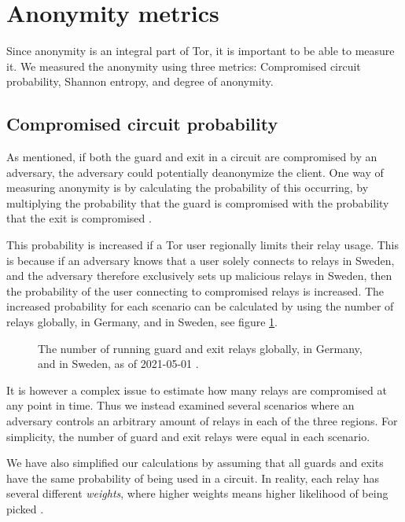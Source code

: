 \documentclass{kththesis}
\begin{document}
\section{Anonymity metrics}
\label{section:anonymityMetrics}
Since anonymity is an integral part of Tor, it is important to be able to measure it. We measured the anonymity using three metrics: Compromised circuit probability, Shannon entropy, and degree of anonymity.

\subsection{Compromised circuit probability}
\label{section:compromisedProbability}
As mentioned, if both the guard and exit in a circuit are compromised by an adversary, the adversary could potentially deanonymize the client. One way of measuring anonymity is by calculating the probability of this occurring, by multiplying the probability that the guard is compromised with the probability that the exit is compromised \parencite{annessilower}. 

This probability is increased if a Tor user regionally limits their relay usage. This is because if an adversary knows that a user solely connects to relays in Sweden, and the adversary therefore exclusively sets up malicious relays in Sweden, then the probability of the user connecting to compromised relays is increased. The increased probability for each scenario can be calculated by using the number of relays globally, in Germany, and in Sweden, see figure \ref{fig:numberGuardExitRelays}.

\begin{figure}[!htb]
  \centering
  
  \caption{The number of running guard and exit relays globally, in Germany, and in Sweden, as of 2021-05-01 \parencite{TorRelaySearch}.}
  \label{fig:numberGuardExitRelays}
\end{figure}

It is however a complex issue to estimate how many relays are compromised at any point in time. Thus we instead examined several scenarios where an adversary controls an arbitrary amount of relays in each of the three regions. For simplicity, the number of guard and exit relays were equal in each scenario.

We have also simplified our calculations by assuming that all guards and exits have the same probability of being used in a circuit. In reality, each relay has several different \emph{weights}, where higher weights means higher likelihood of being picked \parencite{TorPathSpecification}.
\end{document}

